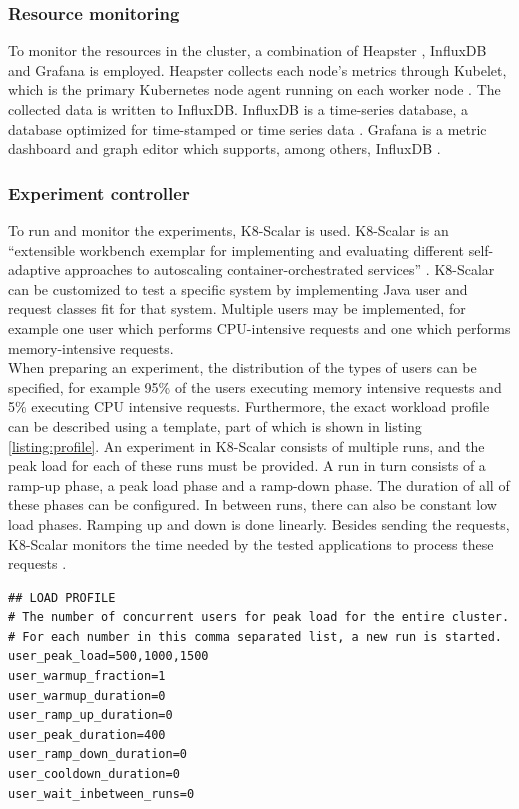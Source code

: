 \subsubsection{Resource monitoring}
To monitor the resources in the cluster, a combination of Heapster \citep{heapster}, InfluxDB \citep{influxdb} and Grafana \citep{grafana} is employed. Heapster collects each node's metrics through Kubelet, which is the primary Kubernetes node agent running on each worker node \citep{kubelet}\citep{heapster-influxdb-grafana}. The collected data is written to InfluxDB. InfluxDB is a time-series database, a database optimized for time-stamped or time series data \citep{timeseriesdb}. Grafana is a metric dashboard and graph editor which supports, among others, InfluxDB \citep{grafana-github}. 

\subsubsection{Experiment controller}
To run and monitor the experiments, K8-Scalar \citep{scalar} is used. K8-Scalar is an ``extensible workbench exemplar for implementing and evaluating different self-adaptive approaches to autoscaling container-orchestrated services'' \citep{scalar-github-overview}. K8-Scalar can be customized to test a specific system by implementing Java user and request classes fit for that system. Multiple users may be implemented, for example one user which performs CPU-intensive requests and one which performs memory-intensive requests. \\

When preparing an experiment, the distribution of the types of users can be specified, for example 95\% of the users executing memory intensive requests and 5\% executing CPU intensive requests. Furthermore, the exact workload profile can be described using a template, part of which is shown in listing \ref{listing:profile}. An experiment in K8-Scalar consists of multiple runs, and the peak load for each of these runs must be provided. A run in turn consists of a ramp-up phase, a peak load phase and a ramp-down phase. The duration of all of these phases can be configured. In between runs, there can also be constant low load phases. Ramping up and down is done linearly. Besides sending the requests, K8-Scalar monitors the time needed by the tested applications to process these requests \citep{scalar}.

\begin{lstlisting}[float,floatplacement=H]
## LOAD PROFILE
# The number of concurrent users for peak load for the entire cluster. 
# For each number in this comma separated list, a new run is started.
user_peak_load=500,1000,1500
user_warmup_fraction=1
user_warmup_duration=0
user_ramp_up_duration=0
user_peak_duration=400
user_ramp_down_duration=0
user_cooldown_duration=0
user_wait_inbetween_runs=0
\end{lstlisting}

